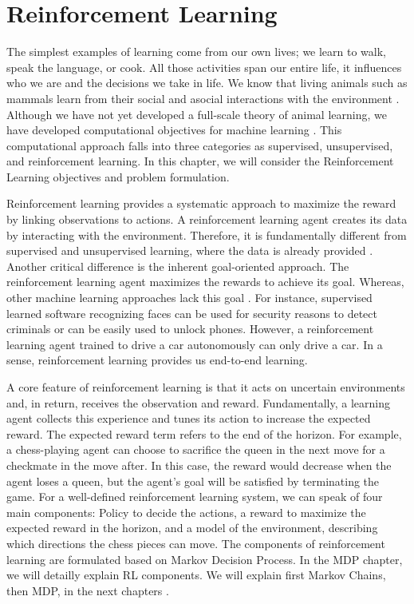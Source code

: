 
\section{Reinforcement Learning}

The simplest examples of learning come from our own lives; we learn to walk, speak the language, or cook. All those activities span our entire life, it influences who we are and the decisions we take in life. We know that living animals such as mammals learn from their social and asocial interactions with the environment \cite{AnimalInt11}. 
Although we have not yet developed a full-scale theory of animal learning, we have developed computational objectives for machine learning \cite{Sutton2018}. 
This computational approach falls into three categories as supervised, unsupervised, and reinforcement learning. In this chapter, we will consider the Reinforcement Learning objectives and problem formulation.

Reinforcement learning provides a systematic approach to maximize the reward by linking observations to actions. A reinforcement learning agent creates its data by interacting with the environment. Therefore, it is fundamentally different from supervised and unsupervised learning, where the data is already provided \cite{Sutton2018}. 
Another critical difference is the inherent goal-oriented approach. The reinforcement learning agent maximizes the rewards to achieve its goal. Whereas, other machine learning approaches lack this goal \cite{Sutton2018}.
For instance, supervised learned software recognizing faces can be used for security reasons to detect criminals or can be easily used to unlock phones. However, a reinforcement learning agent trained to drive a car autonomously can only drive a car. In a sense, reinforcement learning provides us end-to-end learning.

A core feature of reinforcement learning is that it acts on uncertain environments and, in return, receives the observation and reward. Fundamentally, a learning agent collects this experience and tunes its action to increase the expected reward. The expected reward term refers to the end of the horizon. For example, a chess-playing agent can choose to sacrifice the queen in the next move for a checkmate in the move after. In this case, the reward would decrease when the agent loses a queen, but the agent's goal will be satisfied by terminating the game. For a well-defined reinforcement learning system, we can speak of four main components: Policy to decide the actions, a reward to maximize the expected reward in the horizon, and a model of the environment, describing which directions the chess pieces can move. The components of reinforcement learning are formulated based on Markov Decision Process. In the MDP chapter, we will detailly explain RL components. We will explain first Markov Chains, then MDP,  in the next chapters \cite{PerezMIT}.

